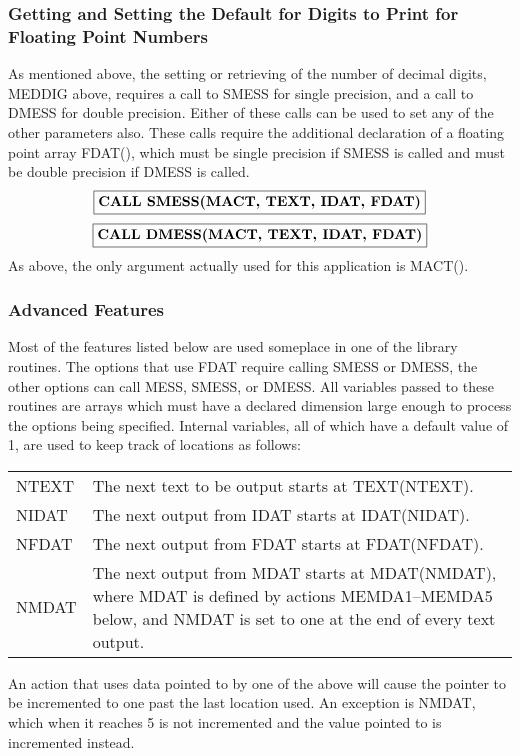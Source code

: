 \documentclass[twoside]{MATH77}
\begin{document}
\subsubsection{Getting and Setting the Default for Digits to Print for
Floating Point Numbers}

As mentioned above, the setting or retrieving of the number of decimal
digits, MEDDIG above, requires a call to SMESS for single precision, and a
call to DMESS for double precision. Either of these calls can be used to set
any of the other parameters also. These calls require the additional
declaration of a floating point array FDAT(), which must be single precision
if SMESS is called and must be double precision if DMESS is called.
$$
\fbox{{\bf CALL SMESS(MACT, TEXT, IDAT, FDAT)}}
$$
$$
\fbox{{\bf CALL DMESS(MACT, TEXT, IDAT, FDAT)}}
$$
As above, the only argument actually used for this application is MACT().

\subsubsection{Advanced Features}

Most of the features listed below are used someplace in one of the
library routines.  The options that use FDAT require calling SMESS or
DMESS, the other options can call MESS, SMESS, or DMESS.  All
variables passed to these routines are arrays which must have a
declared dimension large enough to process the options being specified.
Internal variables, all of which have a default value of 1, are used to
keep track of locations as follows:

\begin{tabular}{lp{2.3in}}
NTEXT & The next text to be output starts at TEXT(NTEXT).\\
NIDAT & The next output from IDAT starts at IDAT(NIDAT).\\
NFDAT & The next output from FDAT starts at FDAT(NFDAT).\\
NMDAT & The next output from MDAT starts at MDAT(NMDAT), where
        MDAT is defined by actions MEMDA1--MEMDA5 below, and
        NMDAT is set to one at the end of every text output.
\end{tabular}

An action that uses data pointed to by one of the above will cause
the pointer to be incremented to one past the last location used.  An
exception is NMDAT, which when it reaches 5 is not incremented and the
value pointed to is incremented instead.
\end{document}

